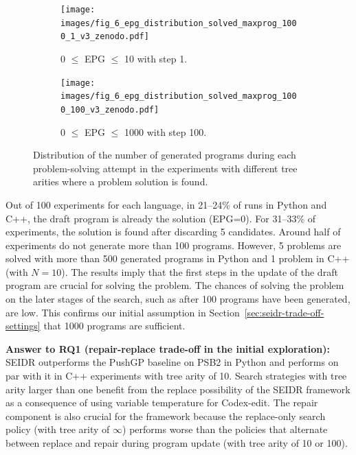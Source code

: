 \begin{figure}[t]
\begin{subfigure}[t]{\columnwidth}
\centering
\texttt{[image: images/fig\_6\_epg\_distribution\_solved\_maxprog\_1000\_1\_v3\_zenodo.pdf]}
  \caption{0 $\leq$ EPG $\leq$ 10 with step 1.}
  \label{fig:seidr:epg-distrib-solved-10}
\end{subfigure}


\begin{subfigure}[t]{\columnwidth}
\centering
\texttt{[image: images/fig\_6\_epg\_distribution\_solved\_maxprog\_1000\_100\_v3\_zenodo.pdf]}
  \caption{0 $\leq$ EPG $\leq$ 1000 with step 100.}
  \label{fig:seidr:epg-distrib-solved-100}
\end{subfigure}
\caption{Distribution of the number of generated programs during each problem-solving attempt in the experiments with different tree arities where a problem solution is found.}
\label{fig:seidr:epg-distribution}
\vspace{-2ex}
\end{figure}

Out of 100 experiments for each language, in 21--24\% of runs in Python and C++, the draft program is already the solution (EPG=0). 
For 31--33\% of experiments, the solution is found after discarding 5 candidates. 
Around half of experiments do not generate more than 100 programs. 
However, 5 problems are solved with more than 500 generated programs in Python and 1 problem in C++ (with $N=10$).
The results imply that the first steps in the update of the draft program are crucial for solving the problem. 
The chances of solving the problem on the later stages of the search, such as after 100 programs have been generated, are low.
This confirms our initial assumption in Section~\ref{sec:seidr-trade-off-settings} that 1000 programs are sufficient.

\begin{framed}
\noindent
\textbf{Answer to RQ1 (repair-replace trade-off in the initial exploration):} 
SEIDR outperforms the PushGP baseline on PSB2 in Python and performs on par with it in C++ experiments with tree arity of 10. 
Search strategies with tree arity larger than one benefit from the replace possibility of the SEIDR framework as a consequence of using variable temperature for Codex-edit.
The repair component is also crucial for the framework because the replace-only search policy (with tree arity of $\infty$) performs worse than the policies that alternate between replace and repair during program update (with tree arity of 10 or 100).  
\end{framed} 


